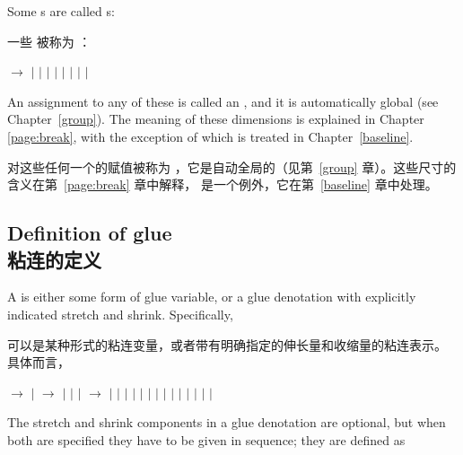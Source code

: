 Some s are called s:\label{special:dimen:list}

一些  被称为 ：
\begin{disp} $\longrightarrow$ \nl
     \indent $|$  $|$  $|$ \nl
     \indent $|$  $|$ \nl
     \indent $|$  $|$  $|$ 
     \end{disp}
An assignment to any of these is
called an , and it is automatically
global (see Chapter~\ref{group}). The meaning of these 
dimensions is explained in Chapter \ref{page:break}, with the
exception of  which is treated in
Chapter~\ref{baseline}.

对这些任何一个的赋值被称为 ，它是自动全局的（见第~\ref{group} 章）。这些尺寸的含义在第~\ref{page:break} 章中解释， 是一个例外，它在第~\ref{baseline} 章中处理。


\subsection{Definition of glue\\粘连的定义}

A  is either some form of glue variable, or
a glue denotation with explicitly indicated stretch and
shrink. Specifically,

 可以是某种形式的粘连变量，或者带有明确指定的伸长量和收缩量的粘连表示。
具体而言，
\begin{disp} $\longrightarrow$ 
     $|$ \nl
      $\longrightarrow$ 
     $|$ \nl 
     \indent $|$  $|$ \nl
      $\longrightarrow$ \nl
     \indent $|$  $|$ \nl
     \indent $|$  $|$ \nl
     \indent $|$  $|$  $|$ 
             $|$ \nl
     \indent $|$  $|$ 
             $|$  $|$ \nl
     \indent $|$  $|$ 
\end{disp}
The stretch and shrink components in a glue denotation
are optional, but when both are specified they have to
be given in sequence; they are defined as

